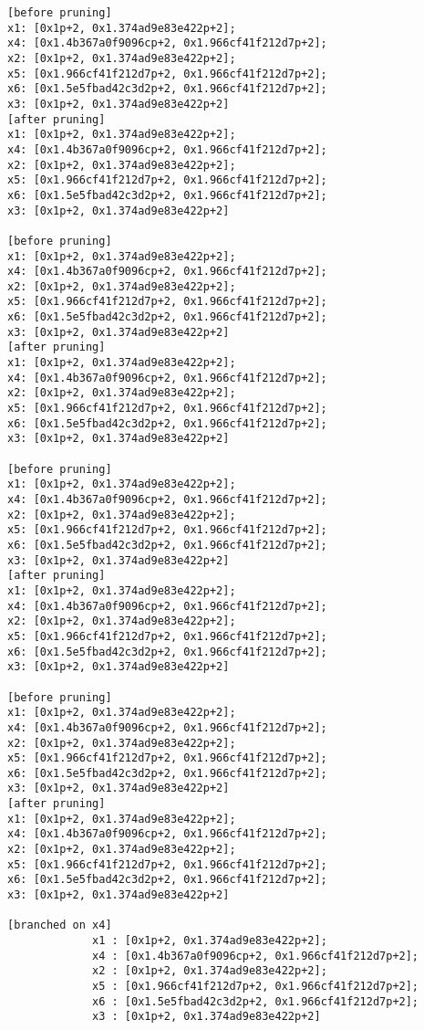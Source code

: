 \begin{lstlisting}
[before pruning]
x1: [0x1p+2, 0x1.374ad9e83e422p+2];
x4: [0x1.4b367a0f9096cp+2, 0x1.966cf41f212d7p+2];
x2: [0x1p+2, 0x1.374ad9e83e422p+2];
x5: [0x1.966cf41f212d7p+2, 0x1.966cf41f212d7p+2];
x6: [0x1.5e5fbad42c3d2p+2, 0x1.966cf41f212d7p+2];
x3: [0x1p+2, 0x1.374ad9e83e422p+2]
[after pruning]
x1: [0x1p+2, 0x1.374ad9e83e422p+2];
x4: [0x1.4b367a0f9096cp+2, 0x1.966cf41f212d7p+2];
x2: [0x1p+2, 0x1.374ad9e83e422p+2];
x5: [0x1.966cf41f212d7p+2, 0x1.966cf41f212d7p+2];
x6: [0x1.5e5fbad42c3d2p+2, 0x1.966cf41f212d7p+2];
x3: [0x1p+2, 0x1.374ad9e83e422p+2]

[before pruning]
x1: [0x1p+2, 0x1.374ad9e83e422p+2];
x4: [0x1.4b367a0f9096cp+2, 0x1.966cf41f212d7p+2];
x2: [0x1p+2, 0x1.374ad9e83e422p+2];
x5: [0x1.966cf41f212d7p+2, 0x1.966cf41f212d7p+2];
x6: [0x1.5e5fbad42c3d2p+2, 0x1.966cf41f212d7p+2];
x3: [0x1p+2, 0x1.374ad9e83e422p+2]
[after pruning]
x1: [0x1p+2, 0x1.374ad9e83e422p+2];
x4: [0x1.4b367a0f9096cp+2, 0x1.966cf41f212d7p+2];
x2: [0x1p+2, 0x1.374ad9e83e422p+2];
x5: [0x1.966cf41f212d7p+2, 0x1.966cf41f212d7p+2];
x6: [0x1.5e5fbad42c3d2p+2, 0x1.966cf41f212d7p+2];
x3: [0x1p+2, 0x1.374ad9e83e422p+2]

[before pruning]
x1: [0x1p+2, 0x1.374ad9e83e422p+2];
x4: [0x1.4b367a0f9096cp+2, 0x1.966cf41f212d7p+2];
x2: [0x1p+2, 0x1.374ad9e83e422p+2];
x5: [0x1.966cf41f212d7p+2, 0x1.966cf41f212d7p+2];
x6: [0x1.5e5fbad42c3d2p+2, 0x1.966cf41f212d7p+2];
x3: [0x1p+2, 0x1.374ad9e83e422p+2]
[after pruning]
x1: [0x1p+2, 0x1.374ad9e83e422p+2];
x4: [0x1.4b367a0f9096cp+2, 0x1.966cf41f212d7p+2];
x2: [0x1p+2, 0x1.374ad9e83e422p+2];
x5: [0x1.966cf41f212d7p+2, 0x1.966cf41f212d7p+2];
x6: [0x1.5e5fbad42c3d2p+2, 0x1.966cf41f212d7p+2];
x3: [0x1p+2, 0x1.374ad9e83e422p+2]

[before pruning]
x1: [0x1p+2, 0x1.374ad9e83e422p+2];
x4: [0x1.4b367a0f9096cp+2, 0x1.966cf41f212d7p+2];
x2: [0x1p+2, 0x1.374ad9e83e422p+2];
x5: [0x1.966cf41f212d7p+2, 0x1.966cf41f212d7p+2];
x6: [0x1.5e5fbad42c3d2p+2, 0x1.966cf41f212d7p+2];
x3: [0x1p+2, 0x1.374ad9e83e422p+2]
[after pruning]
x1: [0x1p+2, 0x1.374ad9e83e422p+2];
x4: [0x1.4b367a0f9096cp+2, 0x1.966cf41f212d7p+2];
x2: [0x1p+2, 0x1.374ad9e83e422p+2];
x5: [0x1.966cf41f212d7p+2, 0x1.966cf41f212d7p+2];
x6: [0x1.5e5fbad42c3d2p+2, 0x1.966cf41f212d7p+2];
x3: [0x1p+2, 0x1.374ad9e83e422p+2]

[branched on x4]
             x1 : [0x1p+2, 0x1.374ad9e83e422p+2];
             x4 : [0x1.4b367a0f9096cp+2, 0x1.966cf41f212d7p+2];
             x2 : [0x1p+2, 0x1.374ad9e83e422p+2];
             x5 : [0x1.966cf41f212d7p+2, 0x1.966cf41f212d7p+2];
             x6 : [0x1.5e5fbad42c3d2p+2, 0x1.966cf41f212d7p+2];
             x3 : [0x1p+2, 0x1.374ad9e83e422p+2]


\end{lstlisting}
